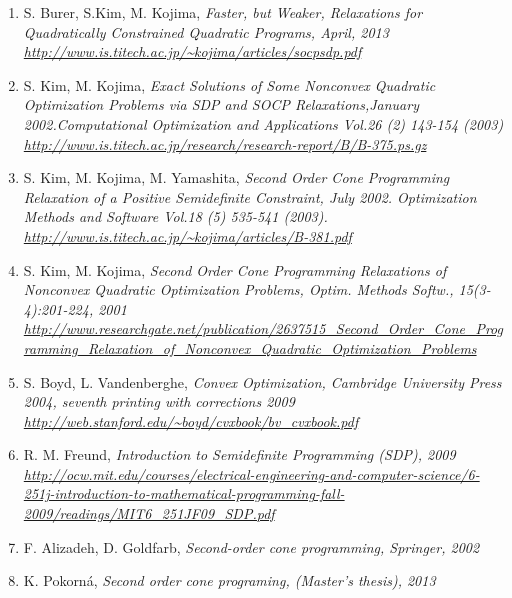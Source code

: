 \documentclass[10pt,oneside]{book}
\theoremstyle{definition}
\begin{document}
\begin{enumerate}
\renewcommand*\labelenumi{[\theenumi]}

%
\item S. Burer, S.Kim, M. Kojima, \it Faster, but Weaker, Relaxations for Quadratically Constrained Quadratic Programs, \rm April, 2013 \\
\url{http://www.is.titech.ac.jp/~kojima/articles/socpsdp.pdf}
\label{BurerKimKojimaFasterWeakerRelax}
%
\item S. Kim, M. Kojima, \it Exact Solutions of Some Nonconvex Quadratic Optimization Problems via SDP and SOCP Relaxations,\rm January 2002.Computational Optimization and Applications Vol.26 (2) 143-154 (2003)\\
\url{http://www.is.titech.ac.jp/research/research-report/B/B-375.ps.gz}
\label{KimKojimaExactSolViaSDPandSOCP}
%
\item S. Kim, M. Kojima, M. Yamashita, \it Second Order Cone Programming Relaxation of a Positive Semidefinite Constraint, \rm July 2002. Optimization Methods and Software Vol.18 (5) 535-541 (2003).\\
\url{http://www.is.titech.ac.jp/~kojima/articles/B-381.pdf}
\label{KimKojimaSOCPRelaxOfPSDconstr}
%
\item S. Kim, M. Kojima, \it Second Order Cone Programming Relaxations of Nonconvex Quadratic Optimization Problems, \rm Optim. Methods Softw., 15(3-4):201-224, 2001 \\
\url{http://www.researchgate.net/publication/2637515_Second_Order_Cone_Programming_Relaxation_of_Nonconvex_Quadratic_Optimization_Problems}
\label{KimKojimaSOCPofNoncvxQOP}
%
\item S. Boyd, L. Vandenberghe, \it Convex Optimization, \rm Cambridge University Press 2004, seventh printing with corrections 2009 \\
\url{http://web.stanford.edu/~boyd/cvxbook/bv_cvxbook.pdf}
\label{BoydCvxOpt}
%
\item R. M. Freund, \it Introduction to Semidefinite Programming (SDP), \rm 2009 \\ \url{http://ocw.mit.edu/courses/electrical-engineering-and-computer-science/6-251j-introduction-to-mathematical-programming-fall-2009/readings/MIT6_251JF09_SDP.pdf}
\label{FreundIntroSDP}
%
\item F. Alizadeh, D. Goldfarb,  \it Second-order cone programming, \rm Springer, 2002 \\
\label{GoldfarbSOCP}
%
\item K. Pokorná, \it Second order cone programing, (Master's thesis), \rm 2013 \\

\end{enumerate}
\end{document}
